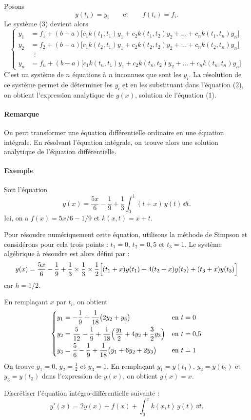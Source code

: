 Posons
\[
  y(t_i) = y_i \qquad\text{et}\qquad f(t_i) = f_i .
\]
Le système (3) devient alors
\begin{equation}
  \left\{
  \begin{aligned}
    y_1 &= f_1 + (b - a)\bigl[c_1k(t_1,t_1)y_1 + c_2k(t_1,t_2)y_2 + \dots + c_nk(t_1,t_n)y_n\bigr]\\
    y_2 &= f_2 + (b - a)\bigl[c_1k(t_2,t_1)y_1 + c_2k(t_2,t_2)y_2 + \dots + c_nk(t_2,t_n)y_n\bigr]\\
    &\;\;\vdots\\
    y_n &= f_n + (b - a)\bigl[c_1k(t_n,t_1)y_1 + c_2k(t_n,t_2)y_2 + \dots + c_nk(t_n,t_n)y_n\bigr]
  \end{aligned}
  \right.
  \tag{4}
\end{equation}
C'est un système de $n$ équations à $n$ inconnues que sont les $y_i$. La
résolution de ce système permet de déterminer les $y_i$ et en les substituant
dans l'équation (2), on obtient l'expression analytique de $y(x)$, solution de
l'équation (1).

\paragraph{Remarque} On peut transformer une équation différentielle
ordinaire en une équation intégrale. En résolvant l'équation intégrale, on
trouve alors une solution analytique de l'équation différentielle.

\paragraph{Exemple} Soit l'équation
\[
  y(x) = \frac{5x}{6} - \frac{1}{9} + \frac{1}{3}\int_0^1 (t + x)\,y(t)\,\dd t .
\]
Ici, on a $f(x) = 5x/6 - 1/9$ et $k(x,t) = x + t$.

Pour résoudre numériquement cette équation, utilisons la méthode de Simpson et
considérons pour cela trois points : $t_1 = 0$, $t_2 = 0{,}5$ et $t_3 = 1$. Le
système algébrique à résoudre est alors défini par :
\[
  y(x) = \frac{5x}{6} - \frac{1}{9}
       + \frac{1}{3}\times\frac{1}{3}\times\frac{1}{2}
         \Bigl[(t_1 + x)y(t_1) + 4(t_2 + x)y(t_2) + (t_3 + x)y(t_3)\Bigr]
\]
car $h = 1/2$.

En remplaçant $x$ par $t_i$, on obtient
\[
  \left\{
  \begin{aligned}
    y_1 &= -\frac{1}{9} + \frac{1}{18}\bigl(2y_2 + y_3\bigr) && \text{en } t = 0\\
    y_2 &= \frac{5}{12} - \frac{1}{9} + \frac{1}{18}\Bigl(\frac{y_1}{2} + 4y_2 + \frac{3}{2}y_3\Bigr) && \text{en } t = 0{,}5\\
    y_3 &= \frac{5}{6} - \frac{1}{9} + \frac{1}{18}\bigl(y_1 + 6y_2 + 2y_3\bigr) && \text{en } t = 1
  \end{aligned}
  \right.
\]
On trouve $y_1 = 0$, $y_2 = \frac{1}{2}$ et $y_3 = 1$. En remplaçant
$y_1 = y(t_1)$, $y_2 = y(t_2)$ et $y_3 = y(t_3)$ dans l'expression de $y(x)$,
on obtient $y(x) = x$.

\begin{exercice}
Discrétiser l'équation intégro-différentielle suivante :
\[
  y'(x) = 2y(x) + f(x) + \int_0^x k(x,t)\,y(t)\,\dd t .
\]
\end{exercice}
